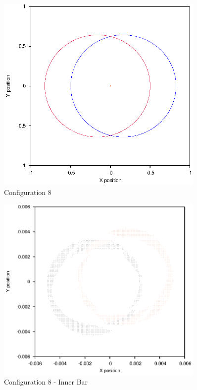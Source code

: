 \documentclass[a4paper,12pt]{article}
\begin{document}
\begin{figure}[H]
\centering
\includegraphics[width=0.9\textwidth]{./results/005-58-005-4/Orbit.eps}
\caption{Configuration 8}
\label{fig:config8}
\end{figure}
\begin{figure}[H]
\centering
\includegraphics[width=0.9\textwidth]{./results/005-58-005-4/Inner.eps}
\caption{Configuration 8 - Inner Bar}
\label{fig:config8i}
\end{figure}
\end{document}
